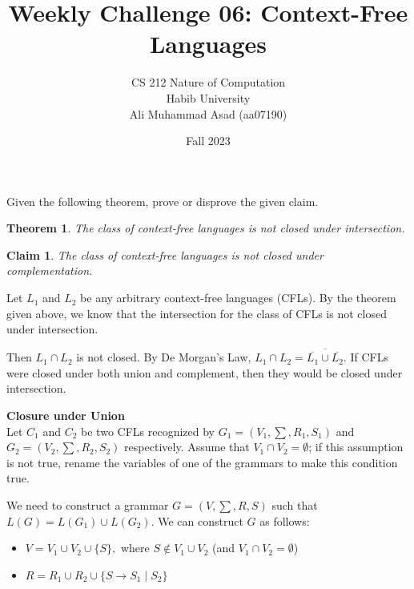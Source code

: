 \documentclass[a4paper]{exam}
\title{Weekly Challenge 06: Context-Free Languages}
\author{CS 212 Nature of Computation\\Habib University\\Ali Muhammad Asad (aa07190)}
\date{Fall 2023}
\newtheorem{theorem}{Theorem}
\newtheorem{claim}{Claim}
\begin{document}
\maketitle

\begin{questions}


Given the following theorem, prove or disprove the given claim.

\begin{theorem}
The class of context-free languages is not closed under intersection.
\end{theorem}
\begin{claim}
The class of context-free languages is not closed under complementation.
\end{claim}

\begin{solution}
	Let $L_1$ and $L_2$ be any arbitrary context-free languages (CFLs). By the theorem given above, we know that the intersection for the class of CFLs is not closed under intersection.

	Then $ L_1 \cap L_2 $ is not closed. By De Morgan's Law, $ L_1 \cap L_2 = \overline{\overline{L_1} \cup \overline{L_2}} $. If CFLs were closed under both union and complement, then they would be closed under intersection. 

	\textbf{Closure under Union} \\ 
	Let $C_1$ and $C_2$ be two CFLs recognized by $ G_1 = (V_1, \sum, R_1, S_1) $ and $ G_2 = (V_2, \sum, R_2, S_2) $ respectively. Assume that $ V_1 \cap V_2 = \emptyset $; if this assumption is not true, rename the variables of one of the grammars to make this condition true. 
	
	We need to construct a grammar $ G = (V, \sum, R, S) $ such that $ L(G) = L(G_1) \cup L(G_2) $. We can construct $ G $ as follows: \vspace*{-3mm} \begin{itemize}
		\item $ V = V_1 \cup V_2 \cup \{ S \}, $ where $ S \notin V_1 \cup V_2 $ (and $ V_1 \cap V_2 = \emptyset $) \vspace*{-2mm}
		\item $ R = R_1 \cup R_2 \cup \{ S \rightarrow S_1 \mid S_2 \} $ 
	\end{itemize}


\end{solution}
\end{questions}
\end{document}

